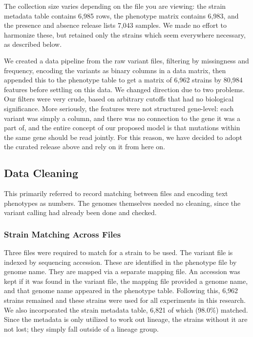 \documentclass[journal]{IEEEtran}
\begin{document}
The collection size varies depending on the file you are viewing: the strain
metadata table contains 6,985 rows, the phenotype matrix contains 6,983, and the
presence and absence release lists 7,043 samples. We made no effort to harmonize
these, but retained only the strains which seem everywhere necessary, as described
below.

We created a data pipeline from the raw variant files, filtering by missingness and
frequency, encoding the variants as binary columns in a data matrix, then appended
this to the phenotype table to get a matrix of 6,962 strains by 80,984 features
before settling on this data. We changed direction due to two problems. Our filters
were very crude, based on arbitrary cutoffs that had no biological significance.
More seriously, the features were not structured gene-level: each variant was
simply a column, and there was no connection to the gene it was a part of, and the
entire concept of our proposed model is that mutations within the same gene should
be read jointly. For this reason, we have decided to adopt the curated release
above and rely on it from here on.

\subsection{Data Cleaning}
\label{sec:datacleaning}

This primarily referred to record matching between files and encoding text
phenotypes as numbers. The genomes themselves needed no cleaning, since the variant
calling had already been done and checked.

\subsubsection{Strain Matching Across Files}
Three files were required to match for a strain to be used. The variant file is
indexed by sequencing accession. These are identified in the phenotype file by
genome name. They are mapped via a separate mapping file. An accession was kept if
it was found in the variant file, the mapping file provided a genome name, and that
genome name appeared in the phenotype table. Following this, 6,962 strains remained
and these strains were used for all experiments in this research. We also
incorporated the strain metadata table, 6,821 of which (98.0\%) matched.
Since the metadata is only utilized to work out lineage, the strains without it are
not lost; they simply fall outside of a lineage group.
\end{document}
